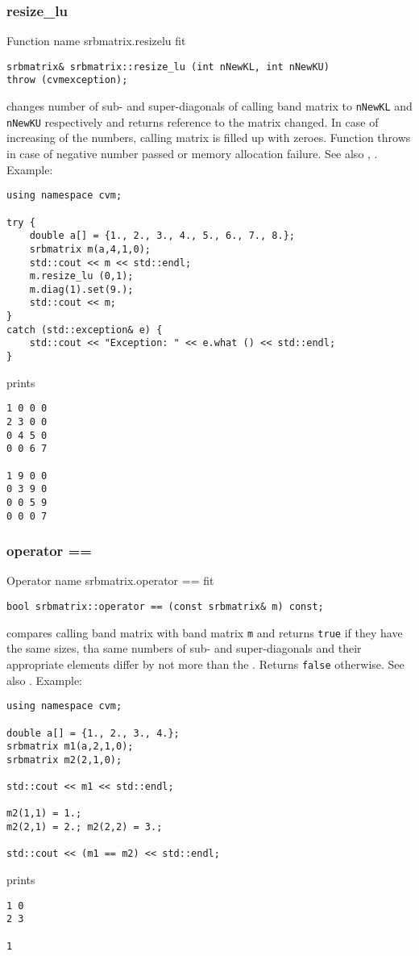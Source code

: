 \subsubsection{resize\_lu}
Function%
\pdfdest name {srbmatrix.resizelu} fit
\begin{verbatim}
srbmatrix& srbmatrix::resize_lu (int nNewKL, int nNewKU) 
throw (cvmexception);
\end{verbatim}
changes  number of sub- and super-diagonals 
of  calling band matrix to \verb"nNewKL" and \verb"nNewKU" respectively
and returns  reference to
the matrix changed. In case of increasing of the numbers, calling matrix
is filled up with zeroes. 
Function throws  
in case of negative number passed or memory allocation failure.
See also ,
.
Example:
\begin{Verbatim}
using namespace cvm;

try {
    double a[] = {1., 2., 3., 4., 5., 6., 7., 8.};
    srbmatrix m(a,4,1,0);
    std::cout << m << std::endl;
    m.resize_lu (0,1);
    m.diag(1).set(9.);
    std::cout << m;
}
catch (std::exception& e) {
    std::cout << "Exception: " << e.what () << std::endl;
}
\end{Verbatim}
prints
\begin{Verbatim}
1 0 0 0
2 3 0 0
0 4 5 0
0 0 6 7

1 9 0 0
0 3 9 0
0 0 5 9
0 0 0 7
\end{Verbatim}
\newpage




\subsubsection{operator ==}
Operator%
\pdfdest name {srbmatrix.operator ==} fit
\begin{verbatim}
bool srbmatrix::operator == (const srbmatrix& m) const;
\end{verbatim}
compares  calling band matrix with  band matrix \verb"m"
and returns \verb"true" if they have the same sizes, tha same
numbers of sub- and super-diagonals 
and their appropriate elements differ by not more than the
.
Returns \verb"false" otherwise.
See also .
Example:
\begin{Verbatim}
using namespace cvm;

double a[] = {1., 2., 3., 4.};
srbmatrix m1(a,2,1,0);
srbmatrix m2(2,1,0);

std::cout << m1 << std::endl;

m2(1,1) = 1.; 
m2(2,1) = 2.; m2(2,2) = 3.;

std::cout << (m1 == m2) << std::endl;
\end{Verbatim}
prints
\begin{Verbatim}
1 0
2 3

1
\end{Verbatim}
\newpage




